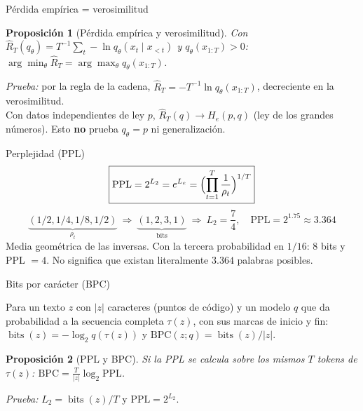 \documentclass[aspectratio=169,10pt]{beamer}
\newtheorem{proposicion}{Proposición}
\begin{document}
\begin{frame}{Pérdida empírica = verosimilitud}
\begin{proposicion}[Pérdida empírica y verosimilitud]
Con $\widehat R_T(q_\theta)=T^{-1}\sum_t-\ln q_\theta(x_t\mid x_{<t})$ y $q_\theta(x_{1:T})>0$:
$\arg\min_\theta\widehat R_T=\arg\max_\theta q_\theta(x_{1:T})$.
\end{proposicion}
\small\emph{Prueba:} por la regla de la cadena, $\widehat R_T=-T^{-1}\ln q_\theta(x_{1:T})$, decreciente en la verosimilitud.\\[2mm]
Con datos independientes de ley $p$, $\widehat R_T(q)\to H_e(p,q)$ (ley de los grandes números). Esto \textbf{no} prueba $q_\theta=p$ ni generalización.
\end{frame}

\begin{frame}{Perplejidad (PPL)}
\[\boxed{\mathrm{PPL}=2^{L_2}=e^{L_e}=\Bigl(\prod_{t=1}^T\frac1{\rho_t}\Bigr)^{1/T}}\]
\[\underbrace{(1/2,1/4,1/8,1/2)}_{\rho_t}\ \Rightarrow\ \underbrace{(1,2,3,1)}_{\text{bits}}\ \Rightarrow\ L_2=\frac74,\quad \mathrm{PPL}=2^{1.75}\approx 3.364\]
\small Media geométrica de las inversas. Con la tercera probabilidad en $1/16$: $8$ bits y PPL $=4$.
No significa que existan literalmente $3.364$ palabras posibles.
\end{frame}

\begin{frame}{Bits por carácter (BPC)}
\begin{definition}
Para un texto $z$ con $|z|$ caracteres (puntos de código) y un modelo $q$ que da probabilidad a la
secuencia completa $\tau(z)$, con sus marcas de inicio y fin:
$\operatorname{bits}(z)=-\log_2q(\tau(z))$ y $\mathrm{BPC}(z;q)=\operatorname{bits}(z)/|z|$.
\end{definition}
\begin{proposicion}[PPL y BPC]
Si la PPL se calcula sobre los mismos $T$ tokens de $\tau(z)$:
$\mathrm{BPC}=\frac{T}{|z|}\log_2\mathrm{PPL}$.
\end{proposicion}
\small\emph{Prueba:} $L_2=\operatorname{bits}(z)/T$ y $\mathrm{PPL}=2^{L_2}$.
\end{frame}
\end{document}
